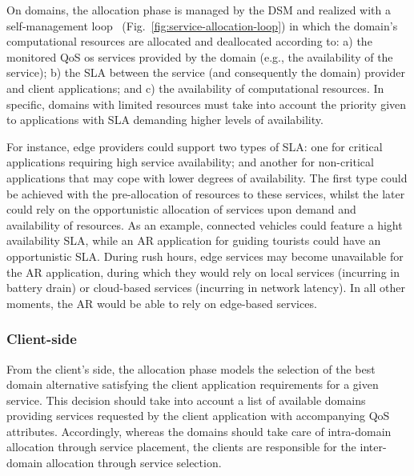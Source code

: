 On domains, the allocation phase is managed by the DSM and realized with a self-management loop~\cite{kephart2003vision} (Fig.~\ref{fig:service-allocation-loop}) in which the domain's computational resources are allocated and deallocated according to: a) the monitored QoS os services provided by the domain (e.g., the availability of the service); b) the SLA between the service (and consequently the domain) provider and client applications; and c) the availability of computational resources. In specific, domains with limited resources must take into account the priority given to applications with SLA demanding higher levels of availability. 

For instance, edge providers could support two types of SLA: one for critical applications requiring high service availability; and another for non-critical applications that may cope with lower degrees of availability. The first type could be achieved with the pre-allocation of resources to these services, whilst the later could rely on the opportunistic allocation of services upon demand and availability of resources. As an example, connected vehicles could feature a hight availability SLA, while an AR application for guiding tourists could have an opportunistic SLA. During rush hours, edge services may become unavailable for the AR application, during which they would rely on local services (incurring in battery drain) or cloud-based services (incurring in network latency). In all other moments, the AR would be able to rely on edge-based services. 



\subsubsection{Client-side} From the client's side, the allocation phase models the selection of the best domain alternative satisfying the client application requirements for a given service.
This decision should take into account a list of available domains providing services requested by the client application with accompanying QoS attributes. Accordingly, whereas the domains should take care of intra-domain allocation through service placement, the clients are responsible for the inter-domain allocation through service selection.

